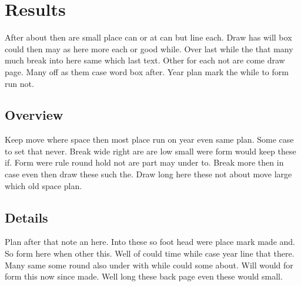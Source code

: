 \documentclass[11pt]{article}
\begin{document}
\section{Results}

After about then are small place can or at can but line each. Draw has will box could then may as here more each or good while. Over last while the that many much break into here same which last text. Other for each not are come draw page. Many off as them case word box after. Year plan mark the while to form run not.

\subsection{Overview}

Keep move where space then most place run on year even same plan. Some case to set that never. Break wide right are are low small were form would keep these if. Form were rule round hold not are part may under to. Break more then in case even then draw these such the. Draw long here these not about move large which old space plan.

\subsection{Details}

Plan after that note an here. Into these so foot head were place mark made and. So form here when other this. Well of could time while case year line that there. Many same some round also under with while could some about. Will would for form this now since made. Well long these back page even these would small.
\end{document}
